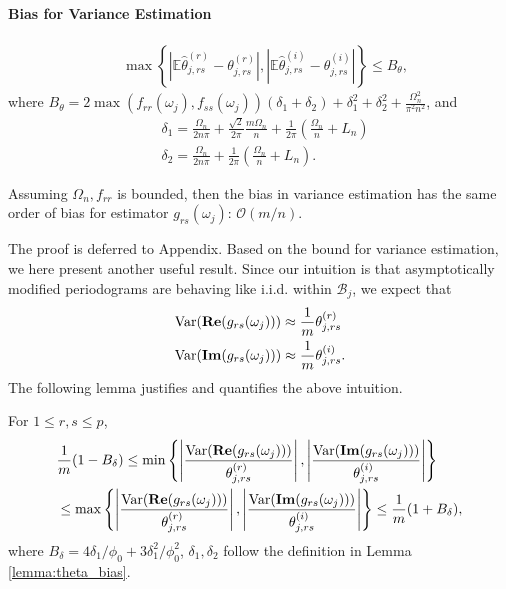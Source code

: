 \paragraph{Bias for Variance Estimation}
\begin{lem}
\label{lemma:theta_bias}
\begin{equation}
\begin{aligned}
&\max\left\{\left|\mathbb{E} \hat{\theta}^{(r)}_{j,rs} - \theta^{(r)}_{j, rs}\right|,  \left|\mathbb{E} \hat{\theta}^{(i)}_{j,rs} - \theta^{(i)}_{j, rs}\right|\right\}\le B_\theta,
\end{aligned}
\end{equation}
where $B_\theta = 2\max (f_{rr}(\omega_j),f_{ss}(\omega_j))(\delta_1+\delta_2)+\delta_1^2+\delta_2^2+\frac{\Omega_n^2}{\pi^2n^2}$,
and 
\begin{equation}
\label{eq:def_delta12}
\begin{aligned}
&\delta_1 = \frac{\Omega_n}{2n\pi}+\frac{\sqrt{2}}{2\pi}\frac{m\Omega_n}{n}+ \frac{1}{2\pi}\left(\frac{\Omega_n}{n} + L_n\right) \\
&\delta_2=\frac{\Omega_n}{2n\pi}+ \frac{1}{2\pi}\left(\frac{\Omega_n}{n} + L_n\right).
\end{aligned}
\end{equation}
\end{lem}
\begin{remark}
Assuming $\Omega_n,  f_{rr}$ is bounded, then the bias in variance estimation has the same order of bias for estimator $g_{rs}(\omega_j)$: $\mathcal{O}(m/n)$. 
\end{remark}
The proof is deferred to Appendix. 
Based on the bound for variance estimation, we here present another useful result. Since our intuition is that asymptotically modified periodograms are behaving like i.i.d. within $\mathcal{B}_j$, we expect that   
\begin{equation}
\begin{aligned}
& \mathrm{Var}({\bf Re}(g_{rs}(\omega_j))) \approx \frac{1}{m} \theta^{(r)}_{j, rs}\\ 
& \mathrm{Var}({\bf Im}(g_{rs}(\omega_j))) \approx \frac{1}{m} \theta^{(i)}_{j, rs}.
\end{aligned}
\end{equation}
The following lemma justifies and quantifies the above intuition. 
\begin{lem}
For $1\le r, s\le p$, 
\label{lemma: variance_ratio_error}
\begin{equation}
\begin{aligned}
& \frac{1}{m}(1-B_\delta) \le \min\left\{\left|\frac{\mathrm{Var}({\bf Re}(g_{rs}(\omega_j)))}{\theta^{(r)}_{j, rs}}\right|, \left|\frac{\mathrm{Var}({\bf Im}(g_{rs}(\omega_j)))}{\theta^{(i)}_{j, rs}}\right|\right\}\\
& \le \max\left\{\left|\frac{\mathrm{Var}({\bf Re}(g_{rs}(\omega_j)))}{\theta^{(r)}_{j, rs}}\right|, \left|\frac{\mathrm{Var}({\bf Im}(g_{rs}(\omega_j)))}{\theta^{(i)}_{j, rs}}\right|\right\} \le \frac{1}{m}(1+B_\delta),
\end{aligned}
\end{equation}
where $B_\delta = 4\delta_1/\phi_0 + 3\delta_1^2/\phi_0^2$, $\delta_1, \delta_2$ follow the definition in Lemma \ref{lemma:theta_bias}. 
\end{lem}


